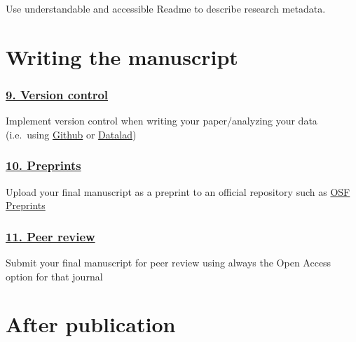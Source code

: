 \documentclass[
  letterpaper,
  DIV=11,
  numbers=noendperiod]{scrreprt}
\begin{document}
Use understandable and accessible Readme to describe research metadata.

\hypertarget{writing-the-manuscript}{%
\section*{Writing the manuscript}\label{writing-the-manuscript}}


\hypertarget{version-control}{%
\subsubsection*{\texorpdfstring{\protect\hyperlink{version-control-1}{9.
Version control}}{9. Version control}}\label{version-control}}

Implement version control when writing your paper/analyzing your data
(i.e.~using \href{https://github.com/}{Github} or
\href{https://www.datalad.org/}{Datalad})

\hypertarget{preprints}{%
\subsubsection*{\texorpdfstring{\protect\hyperlink{preprints-1}{10.
Preprints}}{10. Preprints}}\label{preprints}}

Upload your final manuscript as a preprint to an official repository
such as \href{https://osf.io/preprints/}{OSF Preprints}

\hypertarget{peer-review}{%
\subsubsection*{\texorpdfstring{\protect\hyperlink{peer-review-1}{11.
Peer review}}{11. Peer review}}\label{peer-review}}

Submit your final manuscript for peer review using always the Open
Access option for that journal

\hypertarget{after-publication}{%
\section*{After publication}\label{after-publication}}
\end{document}
